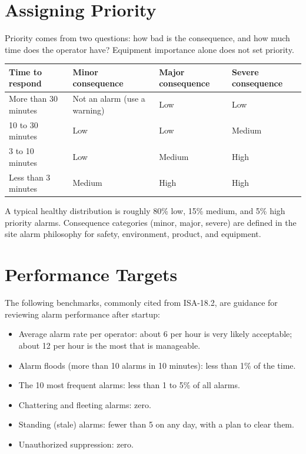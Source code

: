 \section{Assigning Priority}\label{sec:alarm-priority}
Priority comes from two questions: how bad is the consequence, and how much time does the operator have? Equipment importance alone does not set priority.
\begin{center}
\begin{tabular}{@{}P{5.14cm}P{3.79cm}P{3.79cm}P{3.79cm}@{}}
\toprule
{}\textbf{Time to respond} & \textbf{Minor consequence} & \textbf{Major consequence} & \textbf{Severe consequence} \\
\midrule
More than 30 minutes & Not an alarm (use a warning) & Low & Low \\
10 to 30 minutes & Low & Low & Medium \\
3 to 10 minutes & Low & Medium & High \\
Less than 3 minutes & Medium & High & High \\
\bottomrule
\end{tabular}
\end{center}
A typical healthy distribution is roughly 80\% low, 15\% medium, and 5\% high priority alarms. Consequence categories (minor, major, severe) are defined in the site alarm philosophy for safety, environment, product, and equipment.

\section{Performance Targets}
The following benchmarks, commonly cited from ISA-18.2, are guidance for reviewing alarm performance after startup:
\begin{itemize}[itemsep=1pt]
  \item Average alarm rate per operator: about 6 per hour is very likely acceptable; about 12 per hour is the most that is manageable.
  \item Alarm floods (more than 10 alarms in 10 minutes): less than 1\% of the time.
  \item The 10 most frequent alarms: less than 1 to 5\% of all alarms.
  \item Chattering and fleeting alarms: zero.
  \item Standing (stale) alarms: fewer than 5 on any day, with a plan to clear them.
  \item Unauthorized suppression: zero.
\end{itemize}

